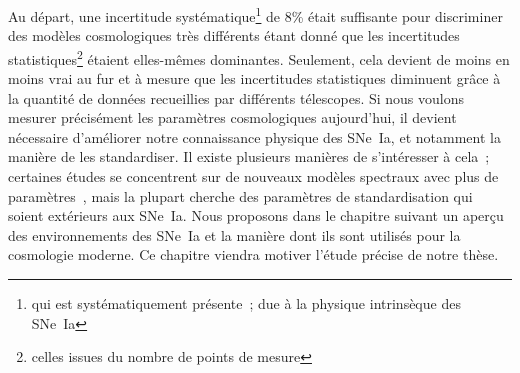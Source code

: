 \documentclass[../main/main.tex]{subfiles}
\begin{document}
Au départ, une incertitude systématique\footnote{qui est systématiquement
présente~; due à la physique intrinsèque des SNe~Ia} de 8\% était suffisante
pour discriminer des modèles cosmologiques très différents étant donné que les
incertitudes statistiques\footnote{celles issues du nombre de points de mesure}
étaient elles-mêmes dominantes. Seulement, cela devient de moins en moins vrai
au fur et à mesure que les incertitudes statistiques diminuent grâce à la
quantité de données recueillies par différents télescopes. Si nous voulons
mesurer précisément les paramètres cosmologiques aujourd'hui, il devient
nécessaire d'améliorer notre connaissance physique des SNe~Ia, et notamment la
manière de les standardiser. Il existe plusieurs manières de s'intéresser à
cela~; certaines études se concentrent sur de nouveaux modèles spectraux avec
plus de paramètres~\cite[par exemple][]{leget2020}, mais la plupart cherche des
paramètres de standardisation qui soient extérieurs aux SNe~Ia. Nous proposons
dans le chapitre suivant un aperçu des environnements des SNe~Ia et la manière
dont ils sont utilisés pour la cosmologie moderne. Ce chapitre viendra motiver
l'étude précise de notre thèse.

\newpage

\thispagestyle{plain}
\vfill
\minilof
\vfill
\minilot
\vfill

% 
% 
\end{document}
